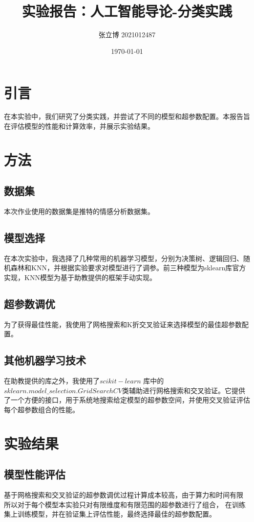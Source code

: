 \documentclass[12pt,a4paper]{article}
\title{实验报告：人工智能导论-分类实践}
\author{张立博 2021012487}
\date{\today}
\begin{document}
\maketitle

\section{引言}
在本实验中，我们研究了分类实践，并尝试了不同的模型和超参数配置。本报告旨在评估模型的性能和计算效率，并展示实验结果。

\section{方法}
\subsection{数据集}
本次作业使用的数据集是推特的情感分析数据集。

\subsection{模型选择}
在本次实验中，我选择了几种常用的机器学习模型，分别为决策树、逻辑回归、随机森林和KNN，并根据实验要求对模型进行了调参。前三种模型为sklearn库官方实现，KNN模型为基于助教提供的框架手动实现。

\subsection{超参数调优}
为了获得最佳性能，我使用了网格搜索和K折交叉验证来选择模型的最佳超参数配置。

\subsection{其他机器学习技术}
在助教提供的库之外，我使用了$scikit-learn$ 库中的$sklearn.model\_selection.GridSearchCV$类辅助进行网格搜索和交叉验证。它提供了一个方便的接口，用于系统地搜索给定模型的超参数空间，并使用交叉验证评估每个超参数组合的性能。

\section{实验结果}
\subsection{模型性能评估}
基于网格搜索和交叉验证的超参数调优过程计算成本较高，由于算力和时间有限
所以对于每个模型本实验只对有限维度和有限范围的超参数进行了组合，
在训练集上训练模型，并在验证集上评估性能，最终选择最佳的超参数配置。
\end{document}
